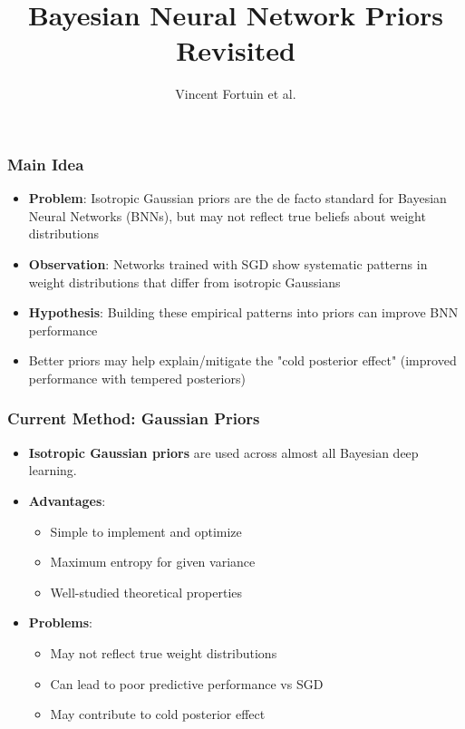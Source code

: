 \documentclass{beamer}
\title{Bayesian Neural Network Priors Revisited}
\author{Vincent Fortuin et al.}
\institute{Talk by: Fedor Sobolevsky}
\date{}
\begin{document}
\begin{frame}
\titlepage
\end{frame}

\begin{frame}
\frametitle{Main Idea}
\begin{itemize}
    \item \textbf{Problem}: Isotropic Gaussian priors are the de facto standard for Bayesian Neural Networks (BNNs), but may not reflect true beliefs about weight distributions
    \item \textbf{Observation}: Networks trained with SGD show systematic patterns in weight distributions that differ from isotropic Gaussians
    \item \textbf{Hypothesis}: Building these empirical patterns into priors can improve BNN performance
    \item Better priors may help explain/mitigate the "cold posterior effect" (improved performance with tempered posteriors)
\end{itemize}
\end{frame}

\begin{frame}
\frametitle{Current Method: Gaussian Priors}
\begin{itemize}
    \item \textbf{Isotropic Gaussian priors} are used across almost all Bayesian deep learning.
    
    \item \textbf{Advantages}:
    \begin{itemize}
        \item Simple to implement and optimize
        \item Maximum entropy for given variance
        \item Well-studied theoretical properties
    \end{itemize}
    
    \item \textbf{Problems}:
    \begin{itemize}
        \item May not reflect true weight distributions
        \item Can lead to poor predictive performance vs SGD
        \item May contribute to cold posterior effect
    \end{itemize}
\end{itemize}
\end{frame}
\end{document}
